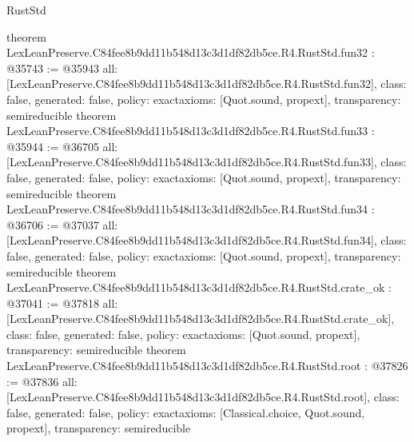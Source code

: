 \begin{lexlean}{RustStd}
\begin{coremodule}
{}
theorem LexLeanPreserve.C84fee8b9dd11b548d13c3d1df82db5ce.R4.RustStd.fun32 : @35743 := @35943 {
  all: [LexLeanPreserve.C84fee8b9dd11b548d13c3d1df82db5ce.R4.RustStd.fun32],
  class: false,
  generated: false,
  policy: exact{axioms: [Quot.sound, propext]},
  transparency: semireducible
}
theorem LexLeanPreserve.C84fee8b9dd11b548d13c3d1df82db5ce.R4.RustStd.fun33 : @35944 := @36705 {
  all: [LexLeanPreserve.C84fee8b9dd11b548d13c3d1df82db5ce.R4.RustStd.fun33],
  class: false,
  generated: false,
  policy: exact{axioms: [Quot.sound, propext]},
  transparency: semireducible
}
theorem LexLeanPreserve.C84fee8b9dd11b548d13c3d1df82db5ce.R4.RustStd.fun34 : @36706 := @37037 {
  all: [LexLeanPreserve.C84fee8b9dd11b548d13c3d1df82db5ce.R4.RustStd.fun34],
  class: false,
  generated: false,
  policy: exact{axioms: [Quot.sound, propext]},
  transparency: semireducible
}
theorem LexLeanPreserve.C84fee8b9dd11b548d13c3d1df82db5ce.R4.RustStd.crate_ok : @37041 := @37818 {
  all: [LexLeanPreserve.C84fee8b9dd11b548d13c3d1df82db5ce.R4.RustStd.crate_ok],
  class: false,
  generated: false,
  policy: exact{axioms: [Quot.sound, propext]},
  transparency: semireducible
}
theorem LexLeanPreserve.C84fee8b9dd11b548d13c3d1df82db5ce.R4.RustStd.root : @37826 := @37836 {
  all: [LexLeanPreserve.C84fee8b9dd11b548d13c3d1df82db5ce.R4.RustStd.root],
  class: false,
  generated: false,
  policy: exact{axioms: [Classical.choice, Quot.sound, propext]},
  transparency: semireducible
}


\end{coremodule}
\end{lexlean}
